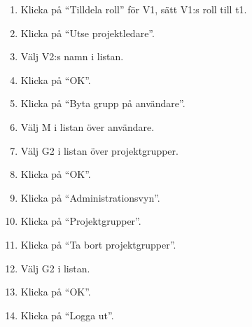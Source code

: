 \documentclass[a4paper]{article}
\begin{document}
\begin{FT}
\begin{enumerate}
\item Klicka på ``Tilldela roll'' för V1, sätt V1:s roll till t1.
\item Klicka på ``Utse projektledare''.
\item Välj V2:s namn i listan.
\item Klicka på ``OK''.
\item Klicka på ``Byta grupp på användare''.
\item Välj M i listan över användare.
\item Välj G2 i listan över projektgrupper.
\item Klicka på ``OK''.
\item Klicka på ``Administrationsvyn''.
\item Klicka på ``Projektgrupper''.
\item Klicka på ``Ta bort projektgrupper''.
\item Välj G2 i listan.
\item Klicka på ``OK''.
\item Klicka på ``Logga ut''. 
\end{enumerate}
\end{FT}
\end{document}
